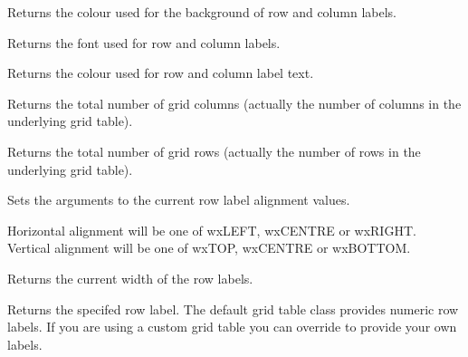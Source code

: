 Returns the colour used for the background of row and column labels.

\label{wxgridgetlabelfont}


Returns the font used for row and column labels.

\label{wxgridgetlabeltextcolour}


Returns the colour used for row and column label text.

\label{wxgridgetnumbercols}


Returns the total number of grid columns (actually the number of columns in the underlying grid
table).

\label{wxgridgetnumberrows}


Returns the total number of grid rows (actually the number of rows in the underlying grid table).

\label{wxgridgetrowlabelalignment}


Sets the arguments to the current row label alignment values.

Horizontal alignment will be one of wxLEFT, wxCENTRE or wxRIGHT. \\
Vertical alignment will be one of wxTOP, wxCENTRE or wxBOTTOM.

\label{wxgridgetrowlabelsize}


Returns the current width of the row labels.

\label{wxgridgetrowlabelvalue}


Returns the specifed row label. The default grid table class provides numeric row labels.
If you are using a custom grid table you can override 
 to provide
your own labels. 

